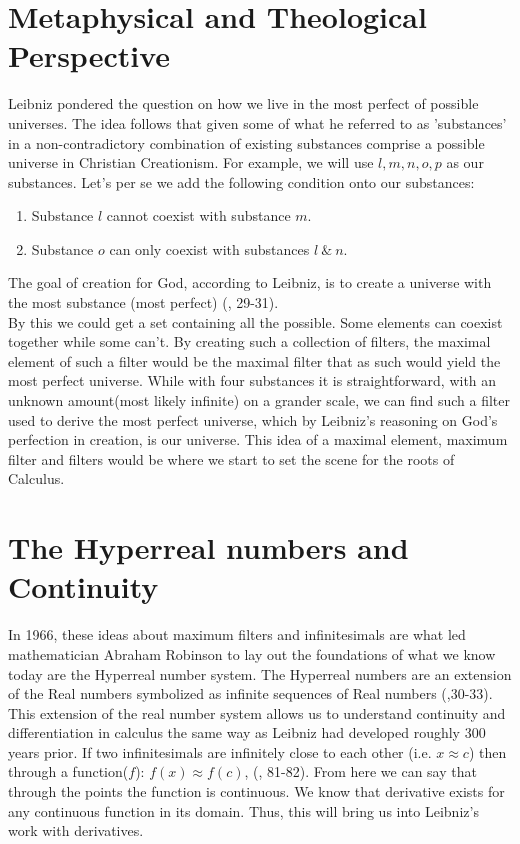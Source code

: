 \documentclass[12pt]{report}
\begin{document}
\section*{Metaphysical and Theological Perspective}
Leibniz pondered the question on how we live in the most perfect of possible universes.
The idea follows that given some of what he referred to as 'substances' in a non-contradictory combination of existing substances comprise a possible universe in Christian Creationism.
For example, we will use $l, m, n, o, p$ as our substances.
Let's per se we add the following condition onto our substances:
    \begin{enumerate}
        \item Substance $l$ cannot coexist with substance $m$.
        \item Substance $o$ can only coexist with substances $l \ \& \ n$.
    \end{enumerate}
The goal of creation for God, according to Leibniz, is to create a universe with the most substance (most perfect) (, 29-31). \\
By this we could get a set containing all the possible.
Some elements can coexist together while some can't.
By creating such a collection of filters, the maximal element of such a filter would be the maximal filter that as such would yield the most perfect universe.
While with four substances it is straightforward, with an unknown amount(most likely infinite) on a grander scale, we can find such a filter used to derive the most perfect universe, which by Leibniz's reasoning on God's perfection in creation, is our universe.
This idea of a maximal element, maximum filter and filters would be where we start to set the scene for the roots of Calculus.

    \section*{The Hyperreal numbers and Continuity}
In 1966, these ideas about maximum filters and infinitesimals are what led mathematician Abraham Robinson to lay out the foundations of what we know today are the Hyperreal number system.
The Hyperreal numbers are an extension of the Real numbers symbolized as infinite sequences of Real numbers (,30-33).
This extension of the real number system allows us to understand continuity and differentiation in calculus the same way as Leibniz had developed roughly 300 years prior.
If two infinitesimals are infinitely close to each other (i.e. $ x \approx c$) then through a function($f$):  $f(x) \approx  f(c)$, (, 81-82).
From here we can say that through the points the function is continuous.
We know that derivative exists for any continuous function in its domain.
Thus, this will bring us into Leibniz's work with derivatives.
\end{document}
